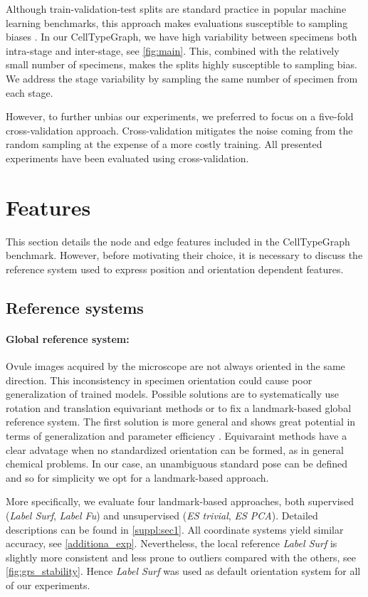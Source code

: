 \documentclass[10pt,twocolumn,letterpaper]{article}
\begin{document}
Although train-validation-test splits are standard practice in popular machine learning benchmarks, this approach makes evaluations susceptible to sampling biases \cite{shchur2018pitfalls}. In our CellTypeGraph, we have high variability between specimens both intra-stage and inter-stage, see \cref{fig:main}.
This, combined with the relatively small number of specimens, makes the splits highly susceptible to sampling bias.
We address the stage variability by sampling the same number of specimen from each stage.

However, to further unbias our experiments, we preferred to focus on a five-fold cross-validation approach. Cross-validation mitigates the noise coming from the random sampling at the expense of a more costly training. All presented experiments have been evaluated using cross-validation.

\section{Features}
This section details the node and edge features included in the CellTypeGraph benchmark. However, before motivating their choice, it is necessary to discuss the reference system used to express position and orientation dependent features. 
\label{sec:features}
\subsection{Reference systems}
\paragraph{Global reference system:}
\label{subsec:grs}
Ovule images acquired by the microscope are not always oriented in the same direction. This inconsistency in specimen orientation could cause poor generalization of trained models. Possible solutions are to systematically use rotation and translation equivariant methods or to fix a landmark-based global reference system. The first solution is more general and shows great potential in terms of generalization and parameter efficiency \cite{finzi2020generalizing, keriven2019universal, satorras2021n}.
Equivaraint methods have a clear advatage when no standardized orientation can be formed, as in general chemical problems. In our case, an unambiguous standard pose can be defined and so for simplicity we opt for a landmark-based approach.

More specifically, we evaluate four landmark-based approaches, both supervised (\textit{Label Surf}, \textit{Label Fu}) and unsupervised (\textit{ES trivial}, \textit{ES PCA}). Detailed descriptions can be found in \cref{suppl:sec1}.
All coordinate systems yield similar accuracy, see \cref{additiona_exp}. Nevertheless, the local reference \textit{Label Surf} is slightly more consistent and less prone to outliers compared with the others, see \cref{fig:grs_stability}. Hence \textit{Label Surf} was used as default orientation system for all of our experiments. 
\end{document}
